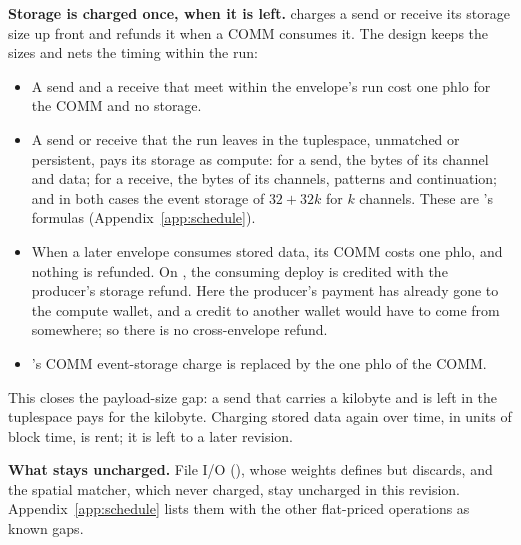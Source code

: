 \documentclass[11pt]{article}
\newcommand{\code}{\path}
\begin{document}
\textbf{Storage is charged once, when it is left.} \code{dev} charges a send or receive its storage size up front and refunds it when a COMM consumes it. The design keeps the sizes and nets the timing within the run:
\begin{itemize}
\item A send and a receive that meet within the envelope's run cost one phlo for the COMM and no storage.
\item A send or receive that the run leaves in the tuplespace, unmatched or persistent, pays its storage as compute: for a send, the bytes of its channel and data; for a receive, the bytes of its channels, patterns and continuation; and in both cases the event storage of $32 + 32k$ for $k$ channels. These are \code{dev}'s formulas (Appendix~\ref{app:schedule}).
\item When a later envelope consumes stored data, its COMM costs one phlo, and nothing is refunded. On \code{dev}, the consuming deploy is credited with the producer's storage refund. Here the producer's payment has already gone to the compute wallet, and a credit to another wallet would have to come from somewhere; so there is no cross-envelope refund.
\item \code{dev}'s COMM event-storage charge is replaced by the one phlo of the COMM.
\end{itemize}
This closes the payload-size gap: a send that carries a kilobyte and is left in the tuplespace pays for the kilobyte. Charging stored data again over time, in units of block time, is rent; it is left to a later revision.

\textbf{What stays uncharged.} File I/O (\code{rho:io:fs:native:*}), whose weights \code{dev} defines but discards, and the spatial matcher, which \code{dev} never charged, stay uncharged in this revision. Appendix~\ref{app:schedule} lists them with the other flat-priced operations as known gaps.
\end{document}
